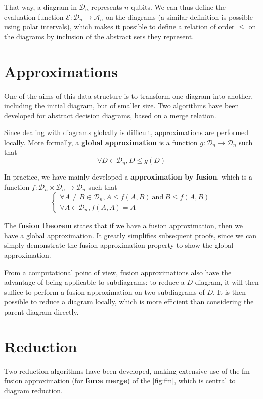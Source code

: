 That way, a diagram in $\mathcal D_n$ represents $n$ qubits.
We can thus define the evaluation function $\mathcal E : \mathcal D_n \to \mathcal A_n$ on the diagrams (a similar definition is possible using polar intervals), which makes it possible to define a relation of order $\le$ on the diagrams by inclusion of the abstract sets they represent.

\section{Approximations}

One of the aims of this data structure is to transform one diagram into another, including the initial diagram, but of smaller size. Two algorithms have been developed for abstract decision diagrams, based on a merge relation.

Since dealing with diagrams globally is difficult, approximations are performed locally. More formally, a \textbf{global approximation} is a function $g : \mathcal D_n \to \mathcal D_n$ such that
$$\forall D \in \mathcal D_n, D \le g(D)$$

In practice, we have mainly developed a \textbf{approximation by fusion}, which is a function $f : \mathcal D_n \times \mathcal D_n \rightarrow \mathcal D_n$ such that
$$\begin{cases}
  \forall A \not= B \in \mathcal{D}_n, A \le f(A, B)~\text{and}~B \le f(A, B) \\
  \forall A \in \mathcal{D}_n, f(A, A) = A
\end{cases}
$$

The \textbf{fusion theorem} states that if we have a fusion approximation, then we have a global approximation. It greatly simplifies subsequent proofs, since we can simply demonstrate the fusion approximation property to show the global approximation.

From a computational point of view, fusion approximations also have the advantage of being applicable to subdiagrams: to reduce a $D$ diagram, it will then suffice to perform a fusion approximation on two subdiagrams of $D$. It is then possible to reduce a diagram locally, which is more efficient than considering the parent diagram directly.

\section{Reduction}

Two reduction algorithms have been developed, making extensive use of the fm fusion approximation (for \textbf{force merge}) of the \autoref{fig:fm}, which is central to diagram reduction.

